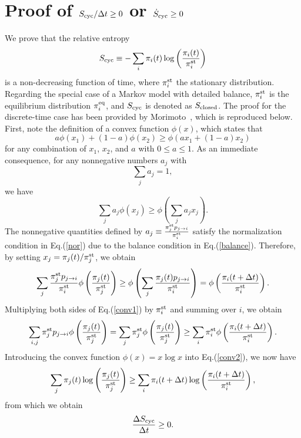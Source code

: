 \documentclass[aps,pre,amsmath,amssymb,floatfix,preprint,nofootinbib]{revtex4}
\begin{document}
\section{Proof of $S_{\rm cyc}/\Delta t \ge 0$ or $\dot S_{\rm cyc} \ge 0$ }\label{entcyc}
We prove that the relative entropy
\begin{equation}
S_{\rm cyc} \equiv -\sum_i \pi_i(t) \log \left(\frac{\pi_i(t)}{\pi^{\rm st}_i}\right)
\end{equation}
is a non-decreasing function of time, where $\pi^{\rm st}_i$ the stationary distribution. Regarding the special case of a Markov model with detailed balance, $\pi^{\rm st}_i$ is the equilibrium distribution $\pi^{\rm eq}_i$, and $S_{\rm cyc}$ is denoted as $S_{\rm closed}$. The proof for the discrete-time case has been provided by Morimoto~\cite{morimoto}, which is reproduced below. First, note the definition of a convex function $\phi(x)$, which states that 
\begin{equation}
a \phi (x_1) + (1-a) \phi (x_2) \ge \phi (a x_1 + (1-a) x_2)  
\end{equation}
for any combination of $x_1$, $x_2$, and $a$ with $0 \le a \le 1$. 
As an immediate consequence, for any nonnegative numbers $a_j$ with
\begin{equation}
\sum_j a_j=1,\label{nor}
\end{equation}
 we have
\begin{equation}
\sum_j a_j \phi (x_j) \ge \phi (\sum_j a_j x_j). \label{conv}
\end{equation}
The nonnegative quantities defined by $a_j \equiv \frac{\pi^{\rm st}_j p_{j \to i}}{\pi^{\rm st}_i}$ satisfy the normalization condition in Eq.(\ref{nor}) due to the balance condition in Eq.(\ref{balance}). Therefore, by setting $x_j= \pi_j (t)/\pi^{\rm st}_j$, we obtain 
\begin{equation}
 \sum_j \frac{\pi^{\rm st}_j p_{j \to i}}{\pi^{\rm st}_i} \phi \left(\frac{\pi_j(t)}{\pi^{\rm st}_j}\right) \ge \phi \left(\sum_j \frac{\pi_j(t)  p_{j \to i}}{\pi^{\rm st}_i}\right) = \phi \left( \frac{ \pi_i(t + \Delta t) }{\pi^{\rm st}_i}\right) . \label{conv1}
\end{equation}
Multiplying both sides of Eq.(\ref{conv1}) by $\pi^{\rm st}_i$ and summing over $i$, we obtain
\begin{equation}
 \sum_{i,j} \pi^{\rm st}_j p_{j \to i} \phi \left(\frac{\pi_j(t)}{\pi^{\rm st}_j}\right) = \sum_{j} \pi^{\rm st}_j  \phi \left(\frac{\pi_j(t)}{\pi^{\rm st}_j}\right) \ge  \sum_i \pi^{\rm st}_i \phi \left( \frac{ \pi_i(t + \Delta t) }{\pi^{\rm st}_i}\right). \label{conv2}
\end{equation} 
Introducing the convex function $\phi(x) = x \log x$ into Eq.(\ref{conv2}), we now have
\begin{equation}
 \sum_{j} \pi_j (t) \log \left(\frac{\pi_j(t)}{\pi^{\rm st}_j}\right) \ge  \sum_i \pi_i  (t + \Delta t) \log \left( \frac{ \pi_i(t + \Delta t) }{\pi^{\rm st}_i}\right),\label{eq1}
\end{equation} 
from which we obtain 
\begin{equation}
\frac{\Delta S_{\rm cyc}}{\Delta t} \ge 0.\label{eq2}
\end{equation}
\end{document}
